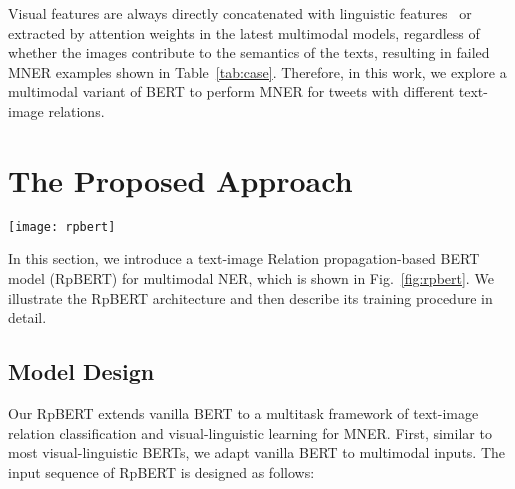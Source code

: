 \documentclass[letterpaper]{article} \usepackage{aaai21}  \usepackage{times}  \usepackage{helvet} \usepackage{courier}  \usepackage[hyphens]{url}  \usepackage{graphicx} \urlstyle{rm} \def\UrlFont{\rm}  \usepackage{natbib}  \usepackage{caption} \frenchspacing  \setlength{\pdfpagewidth}{8.5in}  \setlength{\pdfpageheight}{11in}
\begin{document}
\smallskip
Visual features are always directly concatenated with linguistic features~\cite{yu2019adapting} or extracted by attention weights in the latest multimodal models, regardless of whether the images contribute to the semantics of the texts, resulting in failed MNER examples shown in Table~\ref{tab:case}.
Therefore, in this work, we explore a multimodal variant of BERT to perform MNER for tweets with different text-image relations.



























\section{The Proposed Approach}


\begin{figure*}[tb]
\centering
\texttt{[image: rpbert]}
\caption{The RpBERT architecture overview. Two RpBERTs share the same structure and parameters.}\label{fig:rpbert}
\end{figure*}


In this section, we introduce a text-image Relation propagation-based BERT model (RpBERT) for multimodal NER, which is shown in Fig.~\ref{fig:rpbert}.
We illustrate the RpBERT architecture and then describe its training procedure in detail.
















\subsection{Model Design}
\label{sec:RpBERT}

Our RpBERT extends vanilla BERT to a multitask framework of text-image relation classification and visual-linguistic learning for MNER.
First, similar to most visual-linguistic BERTs, we adapt vanilla BERT to multimodal inputs.
The input sequence of RpBERT is designed as follows:
 
\end{document}
